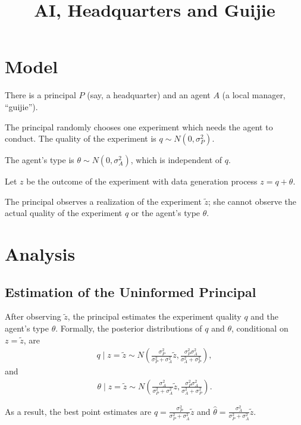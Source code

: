 \documentclass{article}
\title{AI, Headquarters and Guijie}
\begin{document}
\maketitle

\section{Model}

There is a principal $P$ (say, a headquarter) and an agent $A$ (a local manager, ``guijie'').

The principal randomly chooses one experiment which needs the agent to conduct. The quality of the experiment is $q \sim N(0, \sigma_P^2)$. 

The agent's type is $\theta \sim N(0, \sigma_A^2)$, which is independent of $q$.

Let $z$ be the outcome of the experiment with data generation process $ z = q + \theta$.

The principal observes a realization of the experiment $\tilde{z}$; she cannot observe the actual quality of the experiment $q$ or the agent's type $\theta$.


\section{Analysis}
\subsection{Estimation of the Uninformed Principal}

After observing $\tilde{z}$, the principal estimates the experiment quality $q$ and the agent's type $\theta$. Formally, the posterior distributions of $q$ and $\theta$, conditional on $z = \tilde{z}$, are
\begin{align*}
    q \mid z = \tilde{z} \sim N\!\left(\frac{\sigma_P^2}{\sigma_P^2 + \sigma_A^2}\tilde{z}, \frac{\sigma_P^2\sigma_A^2}{\sigma_A^2 + \sigma_P^2}\right),
\end{align*}
and
\begin{align*}
    \theta \mid z = \tilde{z} \sim N\!\left(\frac{\sigma_A^2}{\sigma_P^2 + \sigma_A^2}\tilde{z}, \frac{\sigma_P^2\sigma_A^2}{\sigma_A^2 + \sigma_P^2}\right).
\end{align*}

As a result, the best point estimates are
$\hat{q} = \frac{\sigma_P^2}{\sigma_P^2 + \sigma_A^2}\tilde{z}$ and
$\hat{\theta} = \frac{\sigma_A^2}{\sigma_P^2 + \sigma_A^2}\tilde{z}$.
\end{document}
